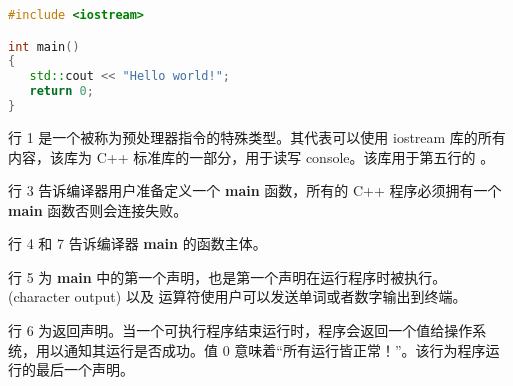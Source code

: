 \documentclass[../../LearnCpp.tex]{subfiles}
\begin{document}

\begin{lstlisting}[language=C++]
#include <iostream>

int main()
{
   std::cout << "Hello world!";
   return 0;
}
\end{lstlisting}

行 1 是一个被称为预处理器指令的特殊类型。其代表可以使用 iostream 库的所有内容，该库为 C++ 标准库的一部分，用于读写 console。该库用于第五行的 。

行 3 告诉编译器用户准备定义一个 \textbf{main} 函数，所有的 C++ 程序必须拥有一个 \textbf{main} 函数否则会连接失败。

行 4 和 7 告诉编译器 \textbf{main} 的函数主体。

行 5 为 \textbf{main} 中的第一个声明，也是第一个声明在运行程序时被执行。  (character output) 以及 \acode{<<} 运算符使用户可以发送单词或者数字输出到终端。

行 6 为返回声明。当一个可执行程序结束运行时，程序会返回一个值给操作系统，用以通知其运行是否成功。值 0 意味着“所有运行皆正常！”。该行为程序运行的最后一个声明。
\end{document}
